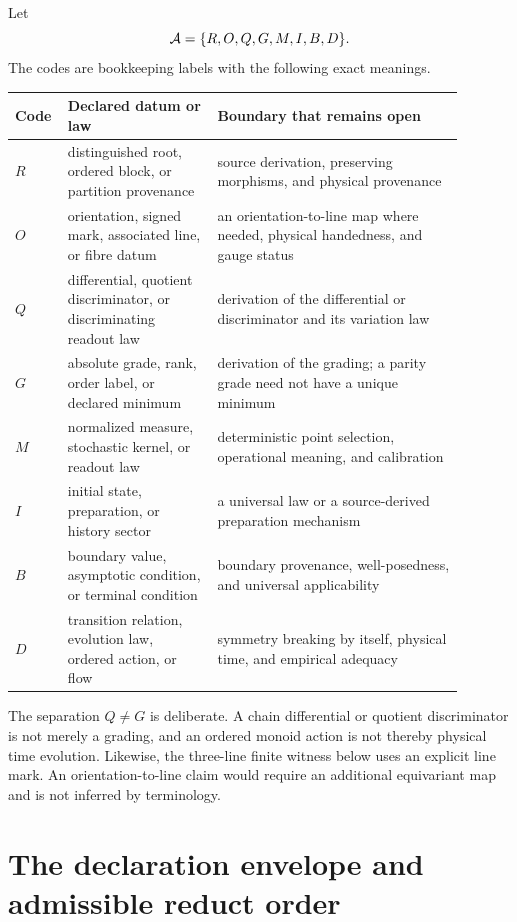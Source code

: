 \documentclass[11pt]{article}
\begin{document}
Let
\[
 {\cal A}=\{R,O,Q,G,M,I,B,D\}.
\]
The codes are bookkeeping labels with the following exact meanings.

\begin{longtable}{>{\raggedright\arraybackslash}p{0.07\linewidth}
                  >{\raggedright\arraybackslash}p{0.31\linewidth}
                  >{\raggedright\arraybackslash}p{0.51\linewidth}}
\toprule
Code & Declared datum or law & Boundary that remains open\\
\midrule
\endhead
\(R\) & distinguished root, ordered block, or partition provenance
& source derivation, preserving morphisms, and physical provenance\\
\(O\) & orientation, signed mark, associated line, or fibre datum
& an orientation-to-line map where needed, physical handedness, and gauge status\\
\(Q\) & differential, quotient discriminator, or discriminating readout law
& derivation of the differential or discriminator and its variation law\\
\(G\) & absolute grade, rank, order label, or declared minimum
& derivation of the grading; a parity grade need not have a unique minimum\\
\(M\) & normalized measure, stochastic kernel, or readout law
& deterministic point selection, operational meaning, and calibration\\
\(I\) & initial state, preparation, or history sector
& a universal law or a source-derived preparation mechanism\\
\(B\) & boundary value, asymptotic condition, or terminal condition
& boundary provenance, well-posedness, and universal applicability\\
\(D\) & transition relation, evolution law, ordered action, or flow
& symmetry breaking by itself, physical time, and empirical adequacy\\
\bottomrule
\end{longtable}

The separation \(Q\neq G\) is deliberate.  A chain differential or quotient
discriminator is not merely a grading, and an ordered monoid action is not
thereby physical time evolution.  Likewise, the three-line finite witness
below uses an explicit line mark.  An orientation-to-line claim would require
an additional equivariant map and is not inferred by terminology.

\section{The declaration envelope and admissible reduct order}
\end{document}
